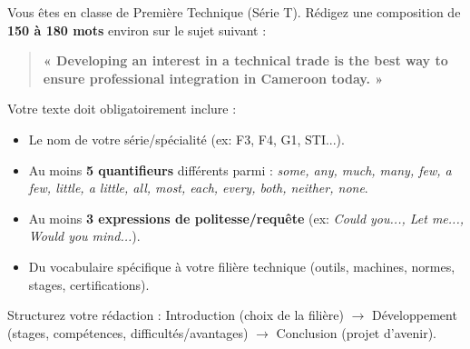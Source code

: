 \documentclass[11pt]{article}
\begin{document}
\begin{exercice}
Vous êtes en classe de Première Technique (Série T). Rédigez une composition de \textbf{150 à 180 mots} environ sur le sujet suivant :
\begin{quote}
\textbf{« Developing an interest in a technical trade is the best way to ensure professional integration in Cameroon today. »}
\end{quote}
Votre texte doit obligatoirement inclure :
\begin{itemize}
    \item Le nom de votre série/spécialité (ex: F3, F4, G1, STI...).
    \item Au moins \textbf{5 quantifieurs} différents parmi : \textit{some, any, much, many, few, a few, little, a little, all, most, each, every, both, neither, none}.
    \item Au moins \textbf{3 expressions de politesse/requête} (ex: \textit{Could you..., Let me..., Would you mind...}).
    \item Du vocabulaire spécifique à votre filière technique (outils, machines, normes, stages, certifications).
\end{itemize}
Structurez votre rédaction : Introduction (choix de la filière) $\rightarrow$ Développement (stages, compétences, difficultés/avantages) $\rightarrow$ Conclusion (projet d'avenir).
\end{exercice}
\end{document}
